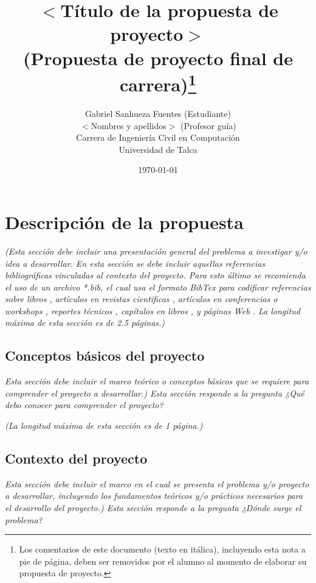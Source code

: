\documentclass[11pt,letterpaper]{article}
\begin{document}
\pagestyle{empty}

\title{
$<$Título de la propuesta de proyecto$>$\\
(Propuesta de proyecto final de carrera)\footnote{Los comentarios de este documento (texto en itálica), incluyendo esta nota a pie de página, deben ser removidos por el alumno al momento de elaborar su propuesta de proyecto.}}
\author{
Gabriel Sanhueza Fuentes (Estudiante)\\
$<$Nombres y apellidos$>$ (Profesor guía)\\
Carrera de Ingeniería Civil en Computación\\ 
Universidad de Talca}
\date{\today}

\maketitle


\section{Descripción de la propuesta}
\emph{(Esta sección debe incluir una presentación general del problema a investigar y/o idea a desarrollar. En esta sección se debe incluir aquellas referencias bibliográficas vinculadas al contexto del proyecto. Para esto último se recomienda el uso de un archivo *.bib, el cual usa el formato BibTex \cite{1} para codificar  referencias sobre libros \cite{2}, artículos en revistas científicas \cite{3}, artículos en conferencias o workshops \cite{4}, reportes técnicos \cite{5}, capítulos en libros \cite{6}, y páginas Web \cite{7}.
La longitud máxima de esta sección es de 2.5 páginas.)}

\subsection{Conceptos básicos del proyecto} 
\emph{Esta sección debe incluir el marco teórico o conceptos básicos que se requiere para comprender el proyecto a desarrollar.) Esta sección responde a la pregunta ¿Qué debo conocer para comprender el proyecto?}

\emph{(La longitud máxima de esta sección es de 1 página.)}


\subsection{Contexto del proyecto} 
\emph{Esta sección debe incluir el marco en el cual se presenta el problema y/o proyecto a desarrollar, incluyendo los fundamentos teóricos y/o prácticos necesarios para el desarrollo del proyecto.) Esta sección responde a la pregunta ¿Dónde surge el problema?}
\end{document}
